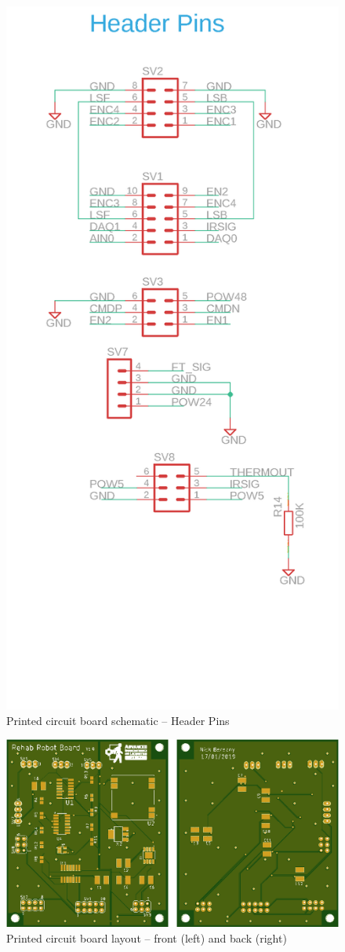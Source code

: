 \documentclass[12pt]{report}
\begin{document}
	
	\begin{figure}[h] 
		\centering
		\includegraphics[width=0.6\linewidth]{pcb_schematic04}
		\caption{Printed circuit board schematic -- Header Pins}
		\label{fig:pcb}
	\end{figure}
	
	
	\begin{figure}[h] 
		\centering
		\includegraphics[width=\linewidth]{pcb_pic}
		\caption{Printed circuit board layout -- front (left) and back (right)}
		\label{fig:pcb_pic}
	\end{figure}
\end{document}
